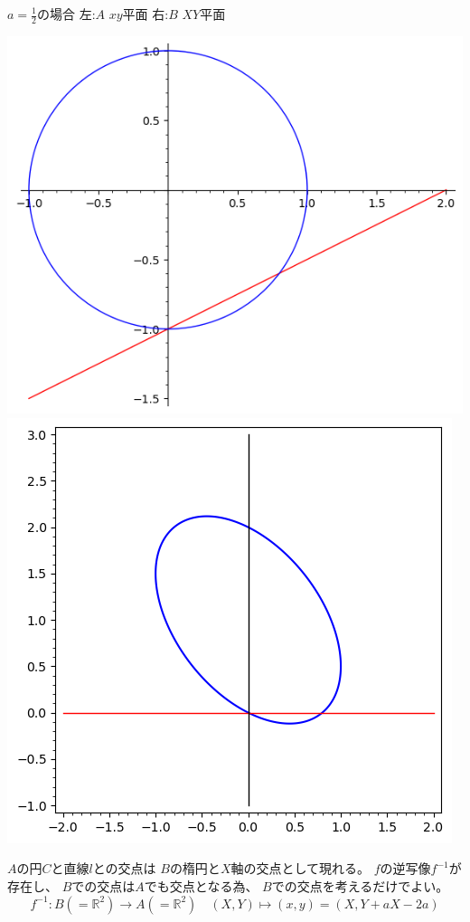 \documentclass[10pt,b5paper]{ltjsarticle}
\begin{document}
$a=\frac{1}{2}$の場合
\quad
左:$A$ $xy$平面
\hfil
右:$B$ $XY$平面
\begin{center}
 \includegraphics[scale=0.5]{tra_h.png}
\hfill %
 \includegraphics[scale=0.5]{trb_h.png}
\end{center}

\hrulefill

$A$の円$C$と直線$l$との交点は
$B$の楕円と$X$軸の交点として現れる。
$f$の逆写像$f^{-1}$が存在し、
$B$での交点は$A$でも交点となる為、
$B$での交点を考えるだけでよい。
\begin{equation}
 f^{-1}: B(=\mathbb{R}^2) \rightarrow A(=\mathbb{R}^2)
  \quad
  (X,Y) \mapsto (x,y)=(X,Y+aX-2a)
\end{equation}
\end{document}

